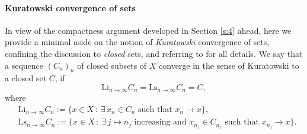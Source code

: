 \documentclass[a4paper,10pt,reqno]{amsart} %
\numberwithin{equation}{section}
\newcommand{\Xs}{X}
\newcommand{\kliminf}{\mathrm{Li}}
\newcommand{\klimsup}{\mathrm{Ls}}
\begin{document}
\paragraph{\bf Kuratowski convergence of sets} In view of the compactness argument developed in Section \ref{s:4} ahead,  here we  provide a minimal aside on the notion of  \emph{Kuratowski} convergence of  sets,  confining the discussion to \emph{closed} sets,  and 
referring to
\cite{Ambrosio-Tilli} for all details.
We say that a
sequence $(C_n)_n$ of closed subsets of $\Xs$ converge in the
sense of Kuratowski to a closed set $C $,
 if
\begin{equation}
\label{kur-conv}
{\kliminf}_{n\to \infty} C_n = {\klimsup}_{n\to\infty} C_n = C,
\end{equation}
where
\begin{subequations}
\begin{align}
&
\label{Lliminf}  {\kliminf}_{n\to\infty} C_n  := \{ x \in \Xs\, : 
 \ \exists\, x_n \in C_n \text{ such that } x_n \to x
\},
\\
& 
\label{Llimsup}
  {\klimsup}_{n\to\infty} C_n  := \{ x \in \Xs\, : \
\exists\, j \mapsto n_j \text{ increasing  and } x_{n_j} \in C_{n_j} \text{ such that } x_{n_j} \to  x  \}.
\end{align}
\end{subequations}
\end{document}
